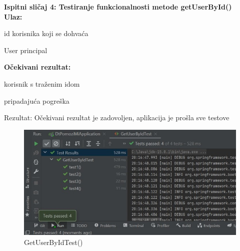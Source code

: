 			\medskip
			
			\noindent \textbf{Ispitni sličaj 4: Testiranje funkcionalnosti metode getUserById()}\\
			
			\medskip
            \noindent\textbf{Ulaz:}
            \begin{packed_enum}
            \item id korisnika koji se dohvaća
            \item User principal
            \end{packed_enum}
            
            \noindent\textbf{Očekivani rezultat:}
            \begin{packed_enum}
            \item korisnik s traženim idom
            \item pripadajuća pogreška
            \end{packed_enum}
            
            \noindent \text
            Rezultat: Očekivani rezultat je zadovoljen, aplikacija je prošla sve testove \\
            
            \begin{figure}[H]
                 \includegraphics[width=\textwidth, height=\textheight, keepaspectratio]{slike/GetUserByIdTest.jpeg}
                \cntering
                \caption{GetUserByIdTest()}
            \end{figure}
            
